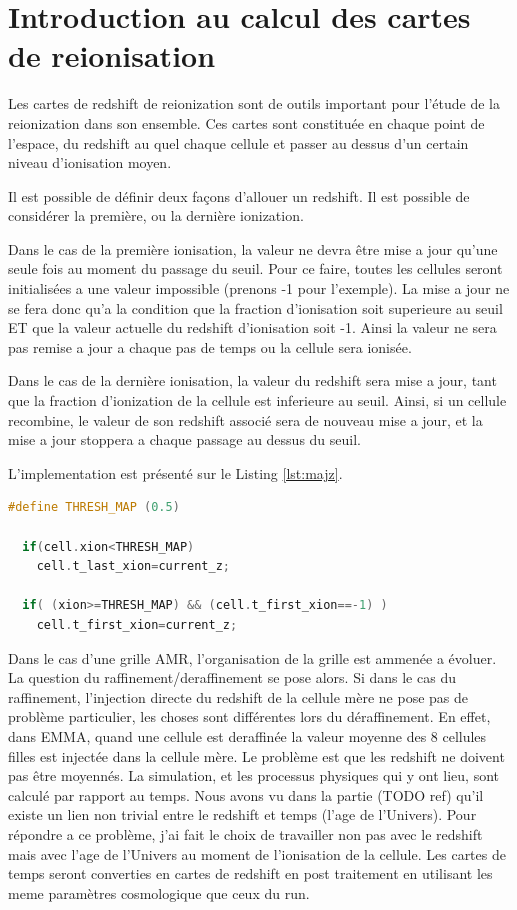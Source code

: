 \chapter{Introduction au calcul des cartes de reionisation}


Les cartes de redshift de reionization sont de outils important pour l'étude de la reionization dans son ensemble.
Ces cartes sont constituée en chaque point de l'espace, du redshift au quel chaque cellule et passer au dessus d'un certain niveau d'ionisation moyen.

Il est possible de définir deux façons d'allouer un redshift.
Il est possible de considérer la première, ou la dernière ionization.

Dans le cas de la première ionisation, la valeur ne devra être mise a jour qu'une seule fois au moment du passage du seuil.
Pour ce faire, toutes les cellules seront initialisées a une valeur impossible (prenons -1 pour l'exemple).
La mise a jour ne se fera donc qu'a la condition que la fraction d'ionisation soit superieure au seuil ET que la valeur actuelle du redshift d'ionisation soit -1.
Ainsi la valeur ne sera pas remise a jour a chaque pas de temps ou la cellule sera ionisée. 

Dans le cas de la dernière ionisation, la valeur du redshift sera mise a jour, tant que la fraction d'ionization de la cellule est inferieure au seuil.
Ainsi, si un cellule recombine, le valeur de son redshift associé sera de nouveau mise a jour, et la mise a jour stoppera a chaque passage au dessus du seuil.

L'implementation est présenté sur le Listing \ref{lst:majz}.

\begin{lstlisting}[float=bth,language=c,frame=tb,caption={Mise a jour du redshift de reionisation},label=lst:majz]
  #define THRESH_MAP (0.5)

  if(cell.xion<THRESH_MAP)
    cell.t_last_xion=current_z;

  if( (xion>=THRESH_MAP) && (cell.t_first_xion==-1) )
    cell.t_first_xion=current_z;
\end{lstlisting}


Dans le cas d'une grille AMR, l'organisation de la grille est ammenée a évoluer.
La question du raffinement/deraffinement  se pose alors.
Si dans le cas du raffinement, l'injection directe du redshift de la cellule mère ne pose pas de problème particulier, les choses sont différentes lors du déraffinement.
En effet, dans EMMA, quand une cellule est deraffinée la valeur moyenne des 8 cellules filles est injectée dans la cellule mère.
Le problème est que les redshift ne doivent pas être moyennés.
La simulation, et les processus physiques qui y ont lieu, sont calculé par rapport au temps.
Nous avons vu dans la partie (TODO ref) qu'il existe un lien non trivial entre le redshift et temps (l'age de l'Univers).
Pour répondre a ce problème, j'ai fait le choix de travailler non pas avec le redshift mais avec l'age de l'Univers au moment de l'ionisation de la cellule.
Les cartes de temps seront converties en cartes de redshift en post traitement en utilisant les meme paramètres cosmologique que ceux du run.

